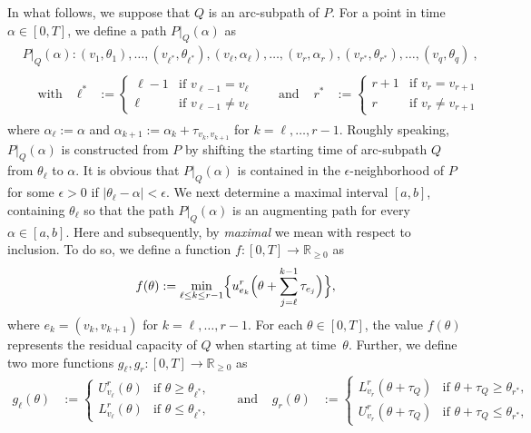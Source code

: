 \documentclass{svjour3}                     \smartqed
\newcommand{\rr}{\ensuremath{\mathbb{R}}}
\begin{document}
In what follows, we suppose that $Q$ is an arc-subpath of $P$. For a point in time~$\alpha\in [0,T]$, we define a path $P|_Q(\alpha)$ as
\begin{align}
\label{eq:P(alpha)}
  &P|_Q(\alpha):
    (v_1,\theta_{1}),\ldots,(v_{\ell^*},\theta_{\ell^*}),
      (v_\ell,\alpha_{\ell}),\ldots,(v_r,\alpha_r),
        (v_{r^*},\theta_{r^*}),\ldots,(v_q,\theta_{q})~, \\
  &\label{eq:P(alpha)_1}\begin{aligned}
  &\text{with  }& \ell^*&:=\begin{cases}
                        \ell - 1 & \text{if } v_{\ell-1} = v_{\ell} \\
                        \ell & \text {if }  v_{\ell-1} \neq v_{\ell}
                      \end{cases}
  &&\text{  and  }& r^*&:=\begin{cases}
                        r + 1 & \text{if } v_{r} = v_{r+1} \\
                        r & \text {if }  v_{r} \neq v_{r+1}
                      \end{cases}
  \end{aligned}
\end{align}
where $\alpha_\ell:=\alpha$ and $\alpha_{k+1}:=\alpha_{k}+\tau_{v_{k},v_{k+1}}$ for $k=\ell,\ldots,r-1$. Roughly speaking,~$P|_Q(\alpha)$ is constructed from $P$ by shifting the starting time of arc-subpath $Q$ from $\theta_\ell$ to $\alpha$. 
It is obvious that $P|_Q(\alpha)$ is contained in the $\epsilon$-neighborhood of $P$ for some $\epsilon>0$ if 
$|\theta_\ell - \alpha| < \epsilon$. 
We next determine a maximal interval $[a,b]$, containing $\theta_\ell$ so that the path $P|_Q(\alpha)$ is an augmenting path for every $\alpha\in [a,b]$.  Here and subsequently, by \emph{maximal} we mean with respect to inclusion. To do so, we define a function $f:[0,T]\rightarrow \rr_{\geq0}$ as
\begin{align*}
f(\theta):=\min_{\ell\leq k\leq r-1}\Bigr\{u^r_{e_k}\Bigl(\theta+\sum_{j=\ell}^{k-1}{\tau_{e_j}}\Bigl)\Bigr\},
\end{align*}
where $e_k=(v_k,v_{k+1})$ for $k=\ell,\ldots,r-1$. For each $\theta\in [0,T]$, the value $f(\theta)$ represents the residual capacity of $Q$ when starting at time~$\theta$. Further, we define two more functions $g_{\ell},g_r:[0,T]\rightarrow \rr_{\geq0}$ as
\begin{align*}
  g_{\ell}(\theta)&:=\begin{cases}
           U^r_{v_\ell}(\theta) &\text{if } \theta\geq \theta_{\ell^*},\\
	   L^r_{v_\ell}(\theta) &\text{if } \theta\leq \theta_{\ell^*},
          \end{cases}
  &&\text{ and }&
  g_{r}(\theta)&:=\begin{cases}
           L^r_{v_r}(\theta+\tau_Q)  &\text{if } \theta+\tau_Q\geq \theta_{r^*},\\
	   U^r_{v_r}(\theta+\tau_Q)&\text{if } \theta+\tau_Q\leq \theta_{r^*},
          \end{cases}
\end{align*}
\end{document}
